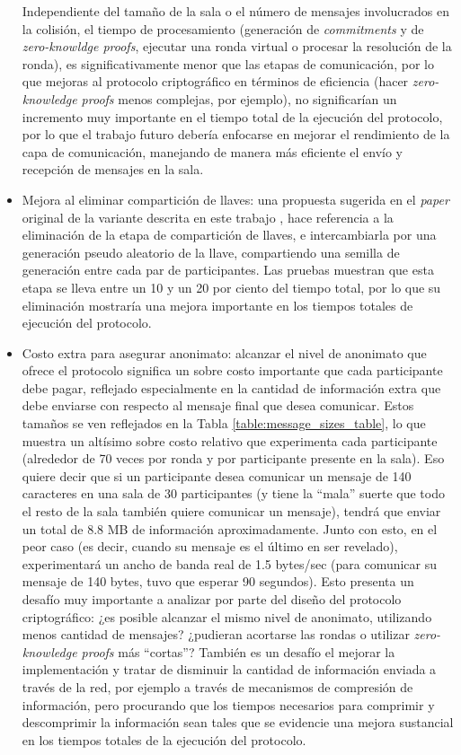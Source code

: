 \begin{itemize}
	Independiente del tamaño de la sala o el número de mensajes involucrados en la colisión, 
	el tiempo de procesamiento (generación de \emph{commitments} y de \emph{zero-knowldge proofs}, 
	ejecutar una ronda virtual o procesar la resolución de la ronda), es significativamente 
	menor que las etapas de comunicación, por lo que mejoras al protocolo criptográfico en 
	términos de eficiencia (hacer \emph{zero-knowledge proofs} menos complejas, por ejemplo), no 
	significarían un incremento muy importante en el tiempo total de la ejecución del protocolo, 
	por lo que el trabajo futuro debería enfocarse en mejorar el rendimiento de la capa 
	de comunicación, manejando de manera más eficiente el envío y recepción de mensajes en la sala.
	\item Mejora al eliminar compartición de llaves: una propuesta sugerida en el \emph{paper} 
	original de la variante descrita en este trabajo \cite{franck2014dining}, hace referencia 
	a la eliminación de la etapa de compartición de llaves, e intercambiarla por una generación 
	pseudo aleatorio de la llave, compartiendo una semilla de generación entre cada par de participantes. 
	Las pruebas muestran que esta etapa se lleva entre un 10 y un 20 por ciento del tiempo total, 
	por lo que su eliminación mostraría una mejora importante en los tiempos totales de 
	ejecución del protocolo. 
	\item Costo extra para asegurar anonimato: alcanzar el nivel de anonimato que ofrece 
	el protocolo significa un sobre costo importante que cada participante debe pagar, reflejado 
	especialmente en la cantidad de información extra que debe enviarse con respecto al mensaje 
	final que desea comunicar. Estos tamaños se ven reflejados en la Tabla \ref{table:message_sizes_table}, 
	lo que muestra un altísimo sobre costo relativo que experimenta cada participante (alrededor de 
	70 veces por ronda y por participante presente en la sala). Eso quiere decir que si un participante 
	desea comunicar un mensaje de 140 caracteres en una sala de 30 participantes (y tiene la ``mala'' suerte 
	que todo el resto de la sala también quiere comunicar un mensaje), tendrá que enviar un 
	total de 8.8 MB de información aproximadamente. Junto con esto, en el peor caso (es decir, cuando 
	su mensaje es el último en ser revelado), experimentará un ancho de banda real de 1.5 bytes/sec 
	(para comunicar su mensaje de 140 bytes, tuvo que esperar 90 segundos). Esto presenta 
	un desafío muy importante a analizar por parte del diseño del protocolo criptográfico: ¿es 
	posible alcanzar el mismo nivel de anonimato, utilizando menos cantidad de mensajes? 
	¿pudieran acortarse las rondas o utilizar \emph{zero-knowledge proofs} más ``cortas''? 
	También es un desafío el mejorar la implementación y tratar de disminuir la cantidad de información 
	enviada a través de la red, por ejemplo a través de mecanismos de compresión de información, pero 
	procurando que los tiempos necesarios para comprimir y descomprimir la información sean tales 
	que se evidencie una mejora sustancial en los tiempos totales de la ejecución del protocolo.
\end{itemize}

